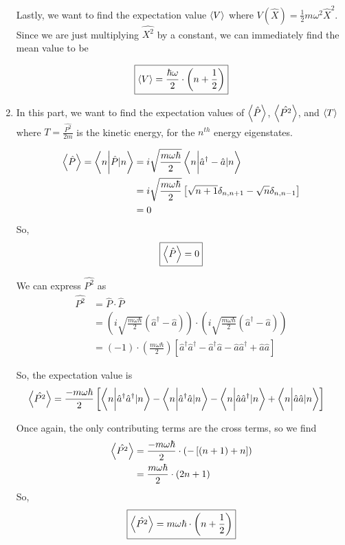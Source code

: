 \documentclass[twoside]{article}
\begin{document}
\begin{enumerate}
   Lastly, we want to find the expectation value $\left\langle V \right\rangle$ where $V(\hat{X}) = \frac{1}{2}m \omega^2 \hat{X}^2$. Since we are just multiplying $\hat{X^2}$ by a constant, we can immediately find the mean value to be 

   \[ \boxed{ \left\langle V \right\rangle = \frac{\hbar\omega}{2}\cdot \left( n + \frac{1}{2} \right)  } \]
   \vskip 1cm

   \item In this part, we want to find the expectation values of $\left\langle \hat{P} \right\rangle$, $\left\langle \hat{P^2} \right\rangle$, and $\left\langle T \right\rangle$ where $T = \frac{\hat{P^2}}{2m}$ is the kinetic energy, for the $n^{th}$ energy eigenstates.

   \begin{align*}
      \left\langle \hat{P} \right\rangle = \left\langle n \bigg\rvert \hat{P}|n \right\rangle &= i\sqrt{\frac{m\omega\hbar}{2}} \left\langle n \bigg\rvert \hat{a}^{\dagger} - \hat{a}|n \right\rangle \\
      &= i\sqrt{\frac{m\omega\hbar}{2}} \left[ \sqrt{n+1}\delta_{n, n+1} - \sqrt{n}\delta_{n, n-1} \right] \\
      &= 0 
   \end{align*}
   So, 
   \[ \boxed{ \left\langle \hat{P} \right\rangle = 0 } \]
   \vskip 1cm

   We can express $\hat{P^2}$ as
   \begin{align*}
      \hat{P^2} &= \hat{P} \cdot \hat{P} \\
      &= \left( i\sqrt{\frac{m\omega\hbar}{2}}(\hat{a}^{\dagger} - \hat{a}) \right) \cdot \left( i\sqrt{\frac{m\omega\hbar}{2}}(\hat{a}^{\dagger} - \hat{a}) \right) \\
      &= (-1) \cdot (\frac{m\omega\hbar}{2}) \left[ \hat{a}^{\dagger}\hat{a}^{\dagger} - \hat{a}^{\dagger}\hat{a} - \hat{a}\hat{a}^{\dagger} + \hat{a}\hat{a} \right]
   \end{align*}
   
   So, the expectation value is 
   \begin{align*}
      \left\langle \hat{P^2} \right\rangle &= \frac{-m\omega\hbar}{2} \left[ \left\langle n \bigg\rvert  \hat{a}^{\dagger}\hat{a}^{\dagger} |n  \right\rangle - \left\langle n \bigg\rvert   \hat{a}^{\dagger}\hat{a} |n  \right\rangle - \left\langle n \bigg\rvert  \hat{a}\hat{a}^{\dagger} |n  \right\rangle + \left\langle n \bigg\rvert \hat{a}\hat{a}|n  \right\rangle \right] 
   \end{align*}

   Once again, the only contributing terms are the cross terms, so we find
   \begin{align*}
      \left\langle \hat{P^2} \right\rangle &= \frac{-m\omega\hbar}{2}\cdot\left(- \left[ (n+1) + n \right] \right) \\
      &= \frac{m\omega\hbar}{2} \cdot \left( 2n + 1 \right)
   \end{align*}
   So, 
   \[ \boxed{\left\langle \hat{P^2} \right\rangle = m\omega\hbar \cdot \left( n + \frac{1}{2} \right) } \]


\end{enumerate}
\end{document}
